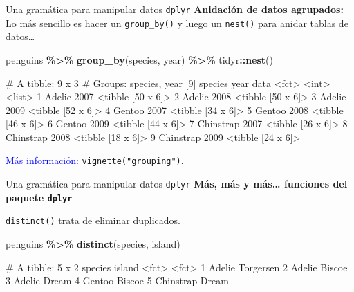 \documentclass[
  ignorenonframetext,
  aspectratio=169]{beamer}
\newenvironment{Shaded}{\begin{snugshade}}{\end{snugshade}}
\newcommand{\FunctionTok}[1]{\textcolor[rgb]{0.13,0.29,0.53}{\textbf{#1}}}
\newcommand{\NormalTok}[1]{#1}
\newcommand{\SpecialCharTok}[1]{\textcolor[rgb]{0.81,0.36,0.00}{\textbf{#1}}}
\let\oldverbatim\verbatim
\let\endoldverbatim\endverbatim
\renewenvironment{verbatim}{\tiny\oldverbatim}{\endoldverbatim}
\newcommand\blue[1]{\textcolor{blue}{#1}}
\begin{document}
\begin{frame}[fragile]{Una gramática para manipular datos
\texttt{dplyr}}
\label{una-gramuxe1tica-para-manipular-datos-dplyr-15}
\textbf{Anidación de datos agrupados:} Lo más sencillo es hacer un
\texttt{group\_by()} y luego un \texttt{nest()} para anidar tablas de
datos\ldots{}

\begin{Shaded}
\begin{Highlighting}[]
\NormalTok{penguins }\SpecialCharTok{\%\textgreater{}\%} 
  \FunctionTok{group\_by}\NormalTok{(species, year) }\SpecialCharTok{\%\textgreater{}\%} 
\NormalTok{  tidyr}\SpecialCharTok{::}\FunctionTok{nest}\NormalTok{()}
\end{Highlighting}
\end{Shaded}

\begin{verbatim}
# A tibble: 9 x 3
# Groups:   species, year [9]
  species    year data             
  <fct>     <int> <list>           
1 Adelie     2007 <tibble [50 x 6]>
2 Adelie     2008 <tibble [50 x 6]>
3 Adelie     2009 <tibble [52 x 6]>
4 Gentoo     2007 <tibble [34 x 6]>
5 Gentoo     2008 <tibble [46 x 6]>
6 Gentoo     2009 <tibble [44 x 6]>
7 Chinstrap  2007 <tibble [26 x 6]>
8 Chinstrap  2008 <tibble [18 x 6]>
9 Chinstrap  2009 <tibble [24 x 6]>
\end{verbatim}

\blue{Más información:} \texttt{vignette("grouping")}.
\end{frame}

\begin{frame}[fragile]{Una gramática para manipular datos
\texttt{dplyr}}
\label{una-gramuxe1tica-para-manipular-datos-dplyr-16}
\textbf{Más, más y más\ldots{} funciones del paquete \texttt{dplyr}}

\texttt{distinct()} trata de eliminar duplicados.

\begin{Shaded}
\begin{Highlighting}[]
\NormalTok{penguins }\SpecialCharTok{\%\textgreater{}\%} 
  \FunctionTok{distinct}\NormalTok{(species, island)}
\end{Highlighting}
\end{Shaded}

\begin{verbatim}
# A tibble: 5 x 2
  species   island   
  <fct>     <fct>    
1 Adelie    Torgersen
2 Adelie    Biscoe   
3 Adelie    Dream    
4 Gentoo    Biscoe   
5 Chinstrap Dream    
\end{verbatim}
\end{frame}
\end{document}
